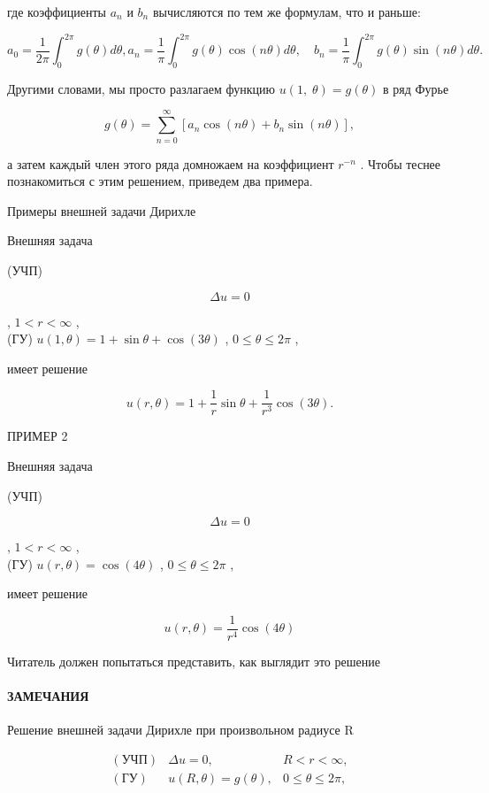 \documentclass[
  ukrainian,
]{article}
\begin{document}
где коэффициенты \(a_n\) и \(b_n\) вычисляются по тем же формулам, что и
раньше:

\[
a_0 = \frac{1}{2\pi} \int_0^{2\pi} g(\theta) d\theta,
a_n = \frac{1}{\pi} \int_0^{2\pi} g(\theta) \cos(n\theta) d\theta, \quad b_n = \frac{1}{\pi} \int_0^{2\pi} g(\theta) \sin(n\theta) d\theta.
\]

Другими словами, мы просто разлагаем функцию
\(u\left(1,\;\theta\right)=g\left(\theta\right)\) в ряд Фурье

\[
g(\theta) = \sum_{n=0}^{\infty} [a_n \cos(n\theta) + b_n \sin(n\theta)],
\]

а затем каждый член этого ряда домножаем на коэффициент \(r^{-n}\) .
Чтобы теснее познакомиться с этим решением, приведем два примера.

Примеры внешней задачи Дирихле

Внешняя задача

(УЧП)

\[
\Delta u = 0
\]

, \(1 < r < \infty\) ,\\
(ГУ) \(u(1, \theta) = 1 + \sin \theta + \cos (3\theta)\) ,
\(0 \le \theta \le 2\pi\) ,

имеет решение

\[
u(r, \theta) = 1 + \frac{1}{r} \sin \theta + \frac{1}{r^3} \cos (3\theta).
\]

ПРИМЕР 2

Внешняя задача

(УЧП)

\[
\Delta u = 0
\]

, \(1 < r < \infty\) ,\\
(ГУ) \(u(r, \theta) = \cos(4\theta)\) , \(0 \le \theta \le 2\pi\) ,

имеет решение

\[
u(r, \theta) = \frac{1}{r^4} \cos(4\theta)
\]

Читатель должен попытаться представить, как выглядит это решение

\paragraph{ЗАМЕЧАНИЯ}\label{ux437ux430ux43cux435ux447ux430ux43dux438ux44f-9}

Решение внешней задачи Дирихле при произвольном радиусе R

\[
\begin{array}{llll} (\text{УЧП}) & \Delta u = 0, & R < r < \infty, \\ (\text{ГУ}) & u (R, \theta) = g (\theta), & 0 \leqslant \theta \leqslant 2\pi, \end{array}
\]
\end{document}
